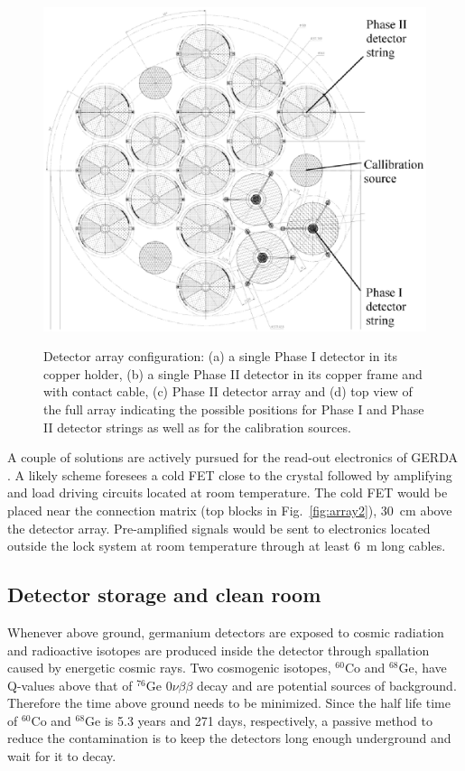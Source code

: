 \begin{figure}[tbhp]
{\includegraphics[height=0.23\textheight]{arrayTop}}%
\caption{Detector array configuration: (a) a single Phase I detector
in its copper holder, (b) a single Phase II detector in its copper
frame and with contact cable, (c) Phase II detector array and (d) top
view of the full array indicating the possible positions for Phase I
and Phase II detector strings as well as for the calibration sources.}
\label{fig:array}
\end{figure}

A couple of solutions are actively pursued for the read-out
electronics of GERDA \cite{Cat07}. A likely scheme foresees a cold FET
close to the crystal followed by amplifying and load driving circuits
located at room temperature. The cold FET would be placed near the
connection matrix (top blocks in Fig.~\ref{fig:array2}), 30~cm above
the detector array. Pre-amplified signals would be sent to electronics
located outside the lock system at room temperature through at least
6~m long cables.

\subsection{Detector storage and clean room}
\label{sec:gerda:source}
Whenever above ground, germanium detectors are exposed to cosmic
radiation and radioactive isotopes are produced inside the detector
through spallation caused by energetic cosmic rays. Two cosmogenic
isotopes, $^{60}$Co and $^{68}$Ge, have Q-values above that of
$^{76}$Ge $0\nu\beta\beta$ decay and are potential sources of
background. Therefore the time above ground needs to be
minimized. Since the half life time of $^{60}$Co and $^{68}$Ge is 5.3
years and 271 days, respectively, a passive method to reduce the
contamination is to keep the detectors long enough underground and
wait for it to decay.

